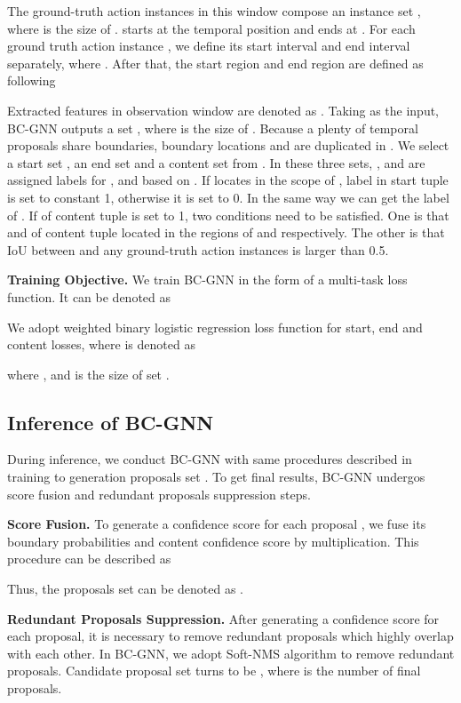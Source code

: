 \documentclass[runningheads]{llncs}
\begin{document}
The ground-truth action instances in this window compose an instance set
, where  is the size of .  starts at the temporal position  and ends at . For each ground truth action instance , we define its start interval  and end interval  separately, where . After that, the start region and end region are defined as following



Extracted features in observation window are denoted as . Taking  as the input, BC-GNN outputs a set , where  is the size of . Because a plenty of temporal proposals share boundaries, boundary locations  and  are duplicated in . We select a start set , an end set  and a content set  from . In these three sets, ,  and  are assigned labels for ,  and  based on . If  locates in the scope of , label  in start tuple  is set to constant 1, otherwise it is set to 0. In the same way we can get the label of . If  of content tuple  is set to 1, two conditions need to be satisfied. One is that  and  of content tuple  located in the regions of  and  respectively. The other is that IoU between  and any ground-truth action instances  is larger than 0.5.

\noindent\textbf{Training Objective.}
We train BC-GNN in the form of a multi-task loss function. It can be denoted as

We adopt weighted binary logistic regression loss function  for start, end and content losses, where  is denoted as

where
,  and  is the size of set .

\subsection{Inference of BC-GNN}
During inference, we conduct BC-GNN with same procedures described in training to generation proposals set . To get final results, BC-GNN undergos score fusion and redundant proposals suppression steps.

\noindent\textbf{Score Fusion.}
To generate a confidence score for each proposal , we fuse its boundary probabilities and content confidence score by multiplication. This procedure can be described as

Thus, the proposals set can be denoted as .

\noindent\textbf{Redundant Proposals Suppression.}
After generating a confidence score for each proposal, it is necessary to remove redundant proposals which highly overlap with each other. In BC-GNN, we adopt Soft-NMS algorithm to remove redundant proposals. Candidate proposal set  turns to be , where  is the number of final proposals.
\end{document}
